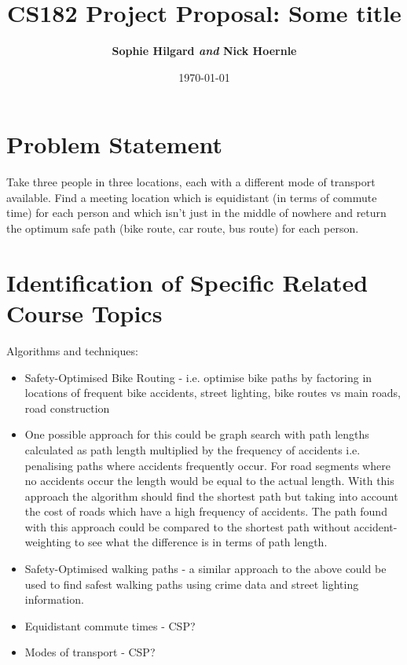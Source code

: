 \documentclass[11pt]{article}
\title{
\vspace{1cm}
\textmd{\textbf{CS182 Project Proposal: Some title}}\\
}
\author{\textbf{Sophie Hilgard \textit{and} Nick Hoernle}}
\date{\today} %
\begin{document}

\maketitle

\lstset{language=Python, basicstyle=\footnotesize} %

\section*{Problem Statement}
Take three people in three locations, each with a different mode of transport available. Find a meeting location which is equidistant (in terms of commute time) for each person and which isn’t just in the middle of nowhere and return the optimum safe path (bike route, car route, bus route) for each person. 

\section{Identiﬁcation of Speciﬁc Related Course Topics}
Algorithms and techniques:
\begin{itemize}
\item Safety-Optimised Bike Routing - i.e. optimise bike paths by factoring in locations of frequent bike accidents, street lighting, bike routes vs main roads, road construction
\item One possible approach for this could be graph search with path lengths calculated as path length multiplied by the frequency of accidents i.e. penalising paths where accidents frequently occur. For road segments where no accidents occur the length would be equal to the actual length. With this approach the algorithm should find the shortest path but taking into account the cost of roads which have a high frequency of accidents. The path found with this approach could be compared to the shortest path without accident-weighting to see what the difference is in terms of path length.
\item Safety-Optimised walking paths - a similar approach to the above could be used to find safest walking paths using crime data and street lighting information.  
\item Equidistant commute times - CSP?
\item Modes of transport - CSP?
\end{itemize}
\end{document}
